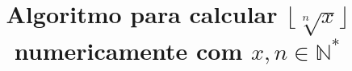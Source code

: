 \title{Algoritmo para calcular $\lfloor \sqrt[n]{x} \rfloor$
       numericamente com $x, n \in \mathds{N}^*$}
